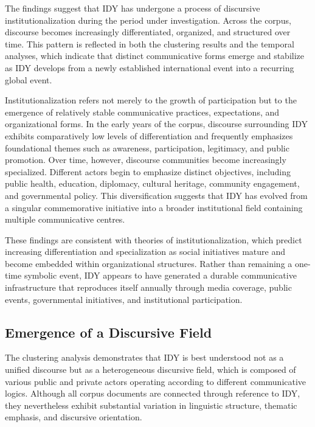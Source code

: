 \documentclass[11pt]{article}
\begin{document}
The findings suggest that IDY has undergone a process of discursive institutionalization during the period under investigation. Across the corpus, discourse becomes increasingly differentiated, organized, and structured over time. This pattern is reflected in both the clustering results and the temporal analyses, which indicate that distinct communicative forms emerge and stabilize as IDY develops from a newly established international event into a recurring global event.

Institutionalization refers not merely to the growth of participation but to the emergence of relatively stable communicative practices, expectations, and organizational forms. In the early years of the corpus, discourse surrounding IDY exhibits comparatively low levels of differentiation and frequently emphasizes foundational themes such as awareness, participation, legitimacy, and public promotion. Over time, however, discourse communities become increasingly specialized. Different actors begin to emphasize distinct objectives, including public health, education, diplomacy, cultural heritage, community engagement, and governmental policy. This diversification suggests that IDY has evolved from a singular commemorative initiative into a broader institutional field containing multiple communicative centres.

These findings are consistent with theories of institutionalization, which predict increasing differentiation and specialization as social initiatives mature and become embedded within organizational structures. Rather than remaining a one-time symbolic event, IDY appears to have generated a durable communicative infrastructure that reproduces itself annually through media coverage, public events, governmental initiatives, and institutional participation.


\subsection{Emergence of a Discursive Field}

The clustering analysis demonstrates that IDY is best understood not as a unified discourse but as a heterogeneous discursive field, which is composed of various public and private actors operating according to different communicative logics. Although all corpus documents are connected through reference to IDY, they nevertheless exhibit substantial variation in linguistic structure, thematic emphasis, and discursive orientation.
\end{document}
